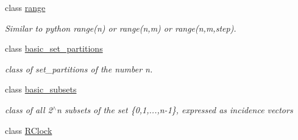 \begin{DoxyCompactItemize}
class \hyperlink{classdscr_1_1range}{range}
\begin{DoxyCompactList}\small\item\em Similar to python range(n) or range(n,m) or range(n,m,step). \end{DoxyCompactList}\item 
class \hyperlink{classdscr_1_1basic__set__partitions}{basic\-\_\-set\-\_\-partitions}
\begin{DoxyCompactList}\small\item\em class of set\-\_\-partitions of the number n. \end{DoxyCompactList}\item 
class \hyperlink{classdscr_1_1basic__subsets}{basic\-\_\-subsets}
\begin{DoxyCompactList}\small\item\em class of all 2$^\wedge$n subsets of the set \{0,1,...,n-\/1\}, expressed as incidence vectors \end{DoxyCompactList}\item 
class \hyperlink{classdscr_1_1_r_clock}{R\-Clock}
\end{DoxyCompactItemize}
